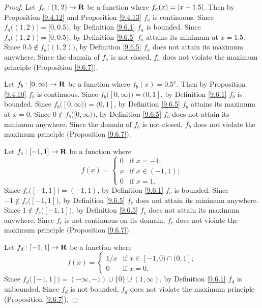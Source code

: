 \begin{proof}
    Let \(f_a : (1, 2) \to \mathbf{R}\) be a function where \(f_a(x) = \left\lvert x - 1.5\right\rvert\).
    Then by Proposition \ref{9.4.12} and Proposition \ref{9.4.13} \(f_a\) is continuous.
    Since \(f_a\big((1, 2)\big) = [0, 0.5)\), by Definition \ref{9.6.1} \(f_a\) is bounded.
    Since \(f_a\big((1, 2)\big) = [0, 0.5)\), by Definition \ref{9.6.5} \(f_a\) attains its minimum at \(x = 1.5\).
    Since \(0.5 \notin f_a\big((1, 2)\big)\), by Definition \ref{9.6.5} \(f_a\) does not attain its maximum anywhere.
    Since the domain of \(f_a\) is not closed, \(f_a\) does not violate the maximum principle (Proposition \ref{9.6.7}).

    Let \(f_b : [0, \infty) \to \mathbf{R}\) be a function where \(f_b(x) = 0.5^x\).
    Then by Proposition \ref{9.4.10} \(f_b\) is continuous.
    Since \(f_b\big([0, \infty)\big) = (0, 1]\), by Definition \ref{9.6.1} \(f_b\) is bounded.
    Since \(f_b\big([0, \infty)\big) = (0, 1]\), by Definition \ref{9.6.5} \(f_b\) attains its maximum at \(x = 0\).
    Since \(0 \notin f_b\big([0, \infty)\big)\), by Definition \ref{9.6.5} \(f_b\) does not attain its minimum anywhere.
    Since the domain of \(f_b\) is not closed, \(f_b\) does not violate the maximum principle (Proposition \ref{9.6.7}).

    Let \(f_c : [-1, 1] \to \mathbf{R}\) be a function where
    \[
        f(x) = \begin{cases}
            0 & \text{if } x = -1;        \\
            x & \text{if } x \in (-1, 1); \\
            0 & \text{if } x = 1.
        \end{cases}
    \]
    Since \(f_c\big([-1, 1]\big) = (-1, 1)\), by Definition \ref{9.6.1} \(f_c\) is bounded.
    Since \(-1 \notin f_c\big([-1, 1]\big)\), by Definition \ref{9.6.5} \(f_c\) does not attain its minimum anywhere.
    Since \(1 \notin f_c\big([-1, 1]\big)\), by Definition \ref{9.6.5} \(f_c\) does not attain its maximum anywhere.
    Since \(f_c\) is not continuous on its domain, \(f_c\) does not violate the maximum principle (Proposition \ref{9.6.7}).

    Let \(f_d : [-1, 1] \to \mathbf{R}\) be a function where
    \[
        f(x) = \begin{cases}
            1 / x & \text{if } x \in [-1, 0) \cap (0, 1]; \\
            0     & \text{if } x = 0.
        \end{cases}
    \]
    Since \(f_d\big([-1, 1]\big) = (-\infty, -1) \cup \{0\} \cup (1, \infty)\), by Definition \ref{9.6.1} \(f_d\) is unbounded.
    Since \(f_d\) is not bounded, \(f_d\) does not violate the maximum principle (Proposition \ref{9.6.7}).
\end{proof}

